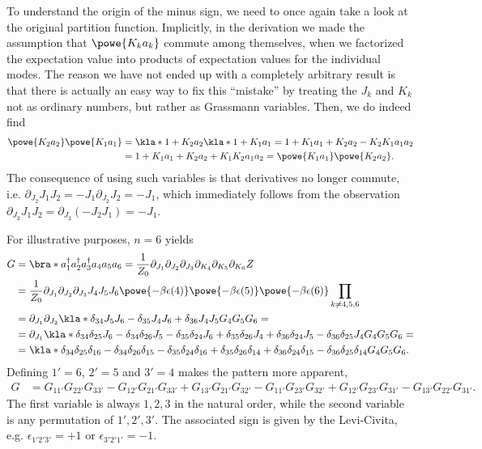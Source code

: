 \documentclass[english, parskip=full]{scrartcl}
\begin{document}
To understand the origin of the minus sign, we need to once again take a look at the original partition function.
Implicitly, in the derivation we made the assumption that $\powe{K_ka_k}$ commute among themselves, when we factorized the expectation value into products of expectation values for the individual modes.
The reason we have not ended up with a completely arbitrary result is that there is actually an easy way to fix this ``mistake'' by treating the $J_k$ and $K_k$ not as ordinary numbers, but rather as Grassmann variables.
Then, we do indeed find
\begin{align}
\powe{K_2a_2} \powe{K_1a_1} &= \kla*{1 + K_2a_2} \kla*{1 + K_1a_1} = 1 + K_1a_1+K_2a_2 - K_2K_1 a_1a_2 \\
&= 1 + K_1a_1+K_2a_2 + K_1K_2 a_1a_2 = \powe{K_1a_1} \powe{K_2a_2}.
\end{align}
The consequence of using such variables is that derivatives no longer commute, i.e. $\partial_{J_2} J_1J_2 = -J_1\partial_{J_2} J_2 = -J_1$, which immediately follows from the observation $\partial_{J_2} J_1J_2 = \partial_{J_2} (-J_2J_1) = -J_1$.

For illustrative purposes, $n=6$ yields
\begin{align}
G &= \bra*{a_1^\dagger a_{2}^\dagger a_{3}^\dagger a_{4} a_{5} a_6} = \frac{1}{Z_0} \partial_{J_1} \partial_{J_2} \partial_{J_3} \partial_{K_4} \partial_{K_5} \partial_{K_6} Z \\
&= \frac{1}{Z_0} \partial_{J_1} \partial_{J_2} \partial_{J_3} J_4J_5J_6 \powe{-\beta\epsilon(4)} \powe{-\beta\epsilon(5)} \powe{-\beta\epsilon(6)} \prod_{k\neq 4,5,6}\\
&= \partial_{J_1} \partial_{J_2} \kla*{\delta_{34} J_5J_6 - \delta_{35} J_4J_6 + \delta_{36} J_4J_5} G_4G_5G_6 = \\
&= \partial_{J_1} \kla*{\delta_{34} \delta_{25}J_6 - \delta_{34} \delta_{26}J_5 - \delta_{35} \delta_{24} J_6 + \delta_{35} \delta_{26} J_4 + \delta_{36} \delta_{24} J_5 - \delta_{36} \delta_{25} J_4} G_4G_5G_6 = \\
&= \kla*{\delta_{34} \delta_{25}\delta_{16} - \delta_{34} \delta_{26}\delta_{15} - \delta_{35} \delta_{24} \delta_{16} + \delta_{35} \delta_{26} \delta_{14} + \delta_{36} \delta_{24} \delta_{15} - \delta_{36} \delta_{25} \delta_{14}} G_4G_5G_6.
\end{align}
Defining $1'=6$, $2'=5$ and $3'=4$ makes the pattern more apparent,
\begin{align}
G &= G_{11'}G_{22'}G_{33'} - G_{12'}G_{21'}G_{33'} + G_{13'} G_{21'}G_{32'}  - G_{11'}G_{23'}G_{32'} + G_{12'}G_{23'}G_{31'} - G_{13'}G_{22'}G_{31'}.
\end{align}
The first variable is always $1,2,3$ in the natural order, while the second variable is any permutation of $1',2',3'$.
The associated sign is given by the Levi-Civita, e.g. $\epsilon_{1'2'3'} = +1$ or $\epsilon_{3'2'1'} = -1$.
\end{document}
